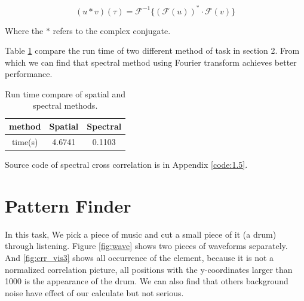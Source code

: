 \begin{equation*}
	(u*v)(\tau)=\mathcal{F}^{-1}\{(\mathcal{F}(u))^{*}\cdot \mathcal{F}(v)\}
\end{equation*}

Where the $*$ refers to the complex conjugate.

Table \ref{tab:run_time} compare the run time of two different method of task in section 2. From which we can find that spectral method using Fourier transform achieves better performance.

\begin{table}[h!]
	\centering
	\caption{Run time compare of spatial and spectral methods.}
	\begin{tabular}{c|c|c}
		\hline
		method & Spatial  & Spectral \\
		\hline
		time(s) & 4.6741 & 0.1103 \\
		\hline
	\end{tabular}
	\label{tab:run_time}
\end{table}

Source code of spectral cross correlation is in Appendix \ref{code:1.5}.

\section{Pattern Finder}

In this task, We pick a piece of music and cut a small piece of it (a drum) through listening. Figure \ref{fig:wave} shows two pieces of waveforms separately. And 
\ref{fig:crr_vis3} shows all occurrence of the element, because it is not a normalized correlation picture, all positions with the y-coordinates larger than 1000 is the appearance of the drum. We can also find that others background noise have effect of our calculate but not serious.

